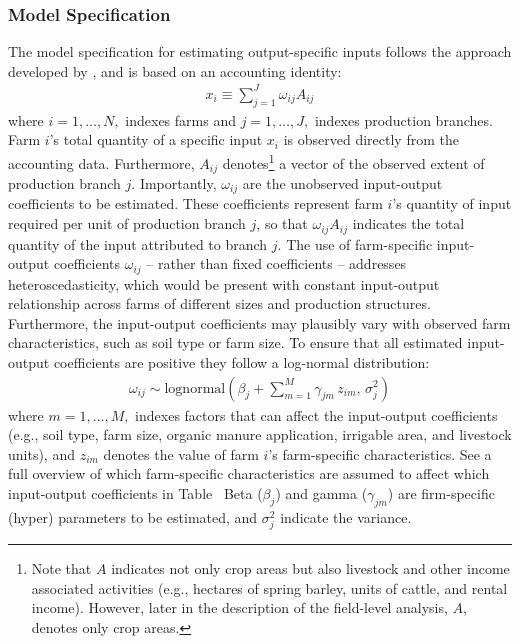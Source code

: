 \documentclass[12pt]{article}
\begin{document}
\subsubsection{Model Specification}
The model specification for estimating output-specific inputs follows the approach developed by \cite{henningsen2026}, and is based on an accounting identity:
\begin{align}
    x_i \equiv \sum_{j=1}^J \omega_{ij} A_{ij}
    \label{eq:accountingID}
\end{align}
where $i = 1, \ldots, N,$ indexes farms and $j = 1, \ldots, J,$ indexes production branches.
Farm $i$'s total quantity of a specific input $x_i$ is observed directly from the accounting data.
Furthermore, $A_{ij}$ denotes\footnote{Note that $A$ indicates not only crop areas but also livestock and other income associated activities (e.g., hectares of spring barley, units of cattle, and rental income).
However, later in the description of the field-level analysis, $A$, denotes only crop areas.} a vector of the observed extent of production branch $j$.
Importantly, $\omega_{ij}$ are
the unobserved input-output coefficients to be estimated.
These coefficients represent farm $i$'s quantity of input required per unit of production branch $j$, so that $\omega_{ij} A_{ij}$ indicates the total quantity of the input attributed to branch $j$.
The use of farm-specific input-output coefficients $\omega_{ij}$ -- rather than fixed coefficients --  addresses heteroscedasticity, which would be present with constant input-output relationship across farms of different sizes and production structures.
Furthermore, the input-output coefficients may plausibly vary with observed farm characteristics, such as soil type or farm size. 
To ensure that all estimated input-output coefficients are positive they follow a log-normal distribution:
\begin{align}
    \omega_{ij} \sim \text{lognormal}\!\left(
    \beta_{j} + \sum_{m=1}^M \gamma_{jm} \, z_{im},\,
    \sigma_{j}^2 \right)
    \label{eq:CoeflogNormal}
\end{align}
where $m = 1, \ldots, M,$ indexes factors that can affect the input-output coefficients (e.g., soil type, farm size, organic manure application, irrigable area, and livestock units), and $z_{im}$ denotes the value of farm $i$'s farm-specific characteristics.
See a full overview of which farm-specific characteristics are assumed to affect which input-output coefficients in Table~ 
Beta ($\beta_j$) and gamma ($\gamma_{jm}$) are firm-specific (hyper) parameters to be estimated, and $\sigma_j^2$ indicate the variance. 
\end{document}
